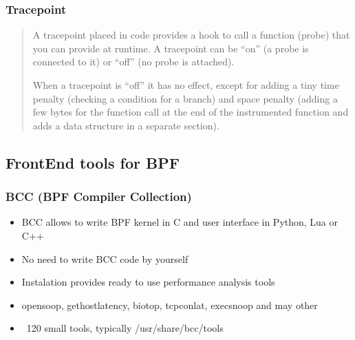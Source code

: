 \documentclass{beamer}
\begin{document}
\begin{frame}
  \frametitle{Tracepoint}
  \begin{quotation}
    \small A tracepoint placed in code provides a hook to call a function (probe) that you can provide at runtime. A tracepoint can be “on” (a probe is connected to it) or “off” (no probe is attached). 
   
    \small When a tracepoint is “off” it has no effect, except for adding a tiny time penalty (checking a condition for a branch) and space penalty (adding a few bytes for the function call at the end of the instrumented function and adds a data structure in a separate section). 
  \end{quotation}
\end{frame}

\subsection{FrontEnd tools for BPF}
\begin{frame}
  \frametitle{BCC (BPF Compiler Collection)}
  \begin{itemize}
    \item<1-> BCC allows to write BPF kernel in C and user interface in Python, Lua or C++
    \item<2-> No need to write BCC code by yourself
    \item<3-> Instalation provides ready to use performance analysis tools
    \item<4-> opensoop, gethostlatency, biotop, tcpconlat, execsnoop and may other
    \item<5-> ~120 small tools, typically /usr/share/bcc/tools
  \end{itemize}
\end{frame}

\begin{frame}
  \begin{figure}
    \centering
    \noindent{}
  \end{figure}
\end{frame}
\end{document}
